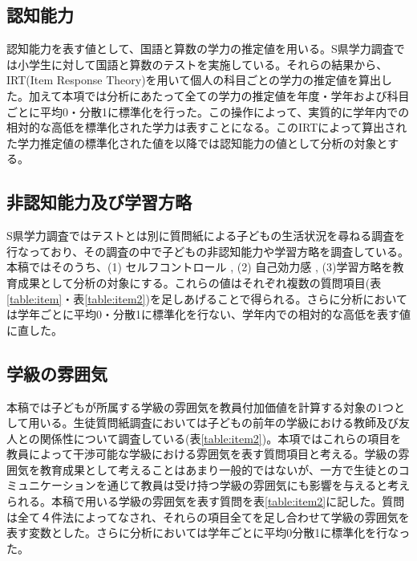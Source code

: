 \documentclass[a4paper,12pt]{article}
\begin{document}
\subsection*{認知能力}
認知能力を表す値として、国語と算数の学力の推定値を用いる。S県学力調査では小学生に対して国語と算数のテストを実施している。それらの結果から、IRT(Item Response Theory)を用いて個人の科目ごとの学力の推定値を算出した。加えて本項では分析にあたって全ての学力の推定値を年度・学年および科目ごとに平均0・分散1に標準化を行った。この操作によって、実質的に学年内での相対的な高低を標準化された学力は表すことになる。このIRTによって算出された学力推定値の標準化された値を以降では認知能力の値として分析の対象とする。

\subsection*{非認知能力及び学習方略}
S県学力調査ではテストとは別に質問紙による子どもの生活状況を尋ねる調査を行なっており、その調査の中で子どもの非認知能力や学習方略を調査している。本稿ではそのうち、(1) セルフコントロール \citep{duckworth2013really}, (2) 自己効力感 \citep{pintrich1991manual}, (3)学習方略\citep{佐藤純1998学習方略の使用と達成目標及び原因帰属との関係}を教育成果として分析の対象にする。これらの値はそれぞれ複数の質問項目(表\ref{table:item}・表\ref{table:item2})を足しあげることで得られる。さらに分析においては学年ごとに平均0・分散1に標準化を行ない、学年内での相対的な高低を表す値に直した。

\subsection*{学級の雰囲気}
本稿では子どもが所属する学級の雰囲気を教員付加価値を計算する対象の1つとして用いる。生徒質問紙調査においては子どもの前年の学級における教師及び友人との関係性について調査している(表\ref{table:item2})。本項ではこれらの項目を教員によって干渉可能な学級における雰囲気を表す質問項目と考える。学級の雰囲気を教育成果として考えることはあまり一般的ではないが、一方で生徒とのコミュニケーションを通じて教員は受け持つ学級の雰囲気にも影響を与えると考えられる。本稿で用いる学級の雰囲気を表す質問を表\ref{table:item2}に記した。質問は全て４件法によってなされ、それらの項目全てを足し合わせて学級の雰囲気を表す変数とした。さらに分析においては学年ごとに平均0分散1に標準化を行なった。

\end{document}
